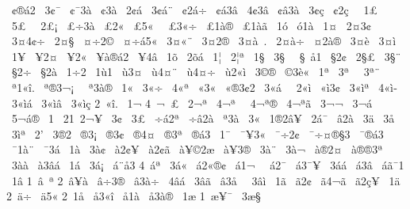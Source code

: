 {^^a0^^a2^^ae^^e12
^^a03^^a2^^af
^^a0^^a2^^af3^^e0
^^a0^^a23^^e0
^^a02^^a2^^e1
^^a03^^a2^^e1^^a8
^^a0^^a22^^e1^^f7
^^a0^^a2^^e13^^e2
^^a04^^a23^^e2
^^a0^^a2^^e23^^e0
^^a03^^a2^^e7
^^a0^^a22^^e7^^a0
^^a01^^a3
^^a05^^a3^^a0
^^a02^^a3^^a1
^^a0^^a3^^f73^^e0
^^a0^^a32^^ab
^^a0^^a35^^ab^^a0
^^a0^^a33^^ab^^f7
^^a0^^a31^^e0^^ae
^^a0^^a31^^e0^^e3
^^a01^^f3
^^a0^^f31^^e0
^^a01^^a4
^^a02^^a43^^a2
^^a03^^a44^^a2^^f7
^^a02^^a4^^a7
^^a0^^a4^^f72^^a9
^^a0^^a4^^f7^^e15^^ab
^^a03^^a4^^ab^^a8
^^a03^^a42^^ae
^^a03^^a4^^e0^^a0.
^^a02^^a4^^e0^^f7
^^a0^^a42^^e0^^ae
^^a03^^a4^^e8
^^a03^^a4^^ec
^^a01^^a5
^^a0^^a52^^a4
^^a0^^a52^^ab
^^a0^^a5^^e0^^ae^^e12
^^a0^^a54^^e2
^^a01^^f5
^^a02^^f5^^e1
^^a01^^a6
^^a02^^a6^^aa
^^a01^^a7
^^a03^^a7^^a0
^^a0^^a7^^a0^^e51
^^a0^^a72^^a2
^^a02^^a7^^a3
^^a03^^a7^^a8
^^a0^^a72^^f7
^^a0^^a72^^e0
^^a01^^f72
^^a01^^f91
^^a0^^f93^^a4
^^a0^^f94^^a4^^a8
^^a0^^f94^^a4^^f7
^^a0^^f92^^ab^^ec
^^a03^^a9^^ae
^^a0^^a93^^e8^^ab
^^a01^^aa
^^a03^^aa^^a0
^^a03^^aa^^a8
^^a0^^aa1^^ab^^ee.
^^a0^^aa^^ae3^^ac^^a1^^a0
^^a0^^aa3^^e0^^ae
^^a01^^ab
^^a03^^ab^^f7
^^a04^^ab^^aa
^^a0^^ab3^^ab
^^a0^^ab^^ae3^^a22
^^a03^^ab^^e1^^a0
^^a02^^ab^^ec
^^a0^^ab^^ec3^^a2
^^a03^^ab^^ec^^aa
^^a04^^ab^^ec^^ad
^^a03^^ab^^ec^^e1
^^a03^^ab^^ec^^e2
^^a03^^ab^^ec^^e7
2^^a0^^ab^^ee.
^^a01^^ac
4^^a0^^ac^^a0^^a3
^^a02^^ac^^aa
^^a04^^ac^^aa^^a0
^^a04^^ac^^aa^^ae
^^a04^^ac^^aa^^e3
^^a03^^ac^^ac
^^a03^^ac^^e1
^^a05^^ac^^e1^^ae
^^a01^^ad
^^a02^^ad1^^a02^^ac^^a5
^^a03^^ad^^a2
^^a03^^ad^^a3
^^a0^^ad^^f7^^e12^^aa
^^a0^^ad^^f7^^e22^^e0
^^a0^^ad^^aa3^^e0
^^a03^^ad^^ab
^^a0^^ad1^^ae2^^e2^^a5
^^a0^^ad2^^e1^^af
^^a0^^ad^^e22^^e0
^^a03^^ad^^e4
^^a03^^ad^^e5
^^a03^^ad^^ec^^aa
^^a02^^ad'
^^a03^^ae2
^^a0^^ae3^^a1
^^a0^^ae3^^a2
^^a0^^ae4^^a4
^^a0^^ae3^^aa
^^a0^^ae^^e13
^^a01^^af
^^a0^^af^^a53^^ab
^^a0^^af^^f72^^a2
^^a0^^af^^f7^^a4^^ae^^a73
^^a0^^af^^ae^^e13
^^a0^^af1^^e0^^a8
^^a0^^af3^^e1
^^a01^^e0
^^a03^^e0^^a2
^^a0^^e02^^a2^^a5
^^a0^^e02^^a2^^e3
^^a0^^e0^^a5^^a92^^e6
^^a0^^e0^^a53^^ae
^^a03^^e0^^a8
^^a03^^e0^^ac
^^a0^^e0^^ae2^^a4^^ad
^^a0^^e0^^ae^^ae3^^aa
^^a03^^e0^^e0
^^a0^^e03^^e2^^e1
^^a01^^e1
^^a03^^e1^^a1
^^a0^^e1^^a8^^ad^^e53
4^^a0^^e1^^aa
^^a03^^e1^^ab
^^a0^^e12^^ab^^ae^^a2
^^a0^^e11^^ac^^a0
^^a0^^e12^^af
^^a0^^e13^^af^^a5
^^a03^^e1^^e1
^^a0^^e13^^e2^^ad
^^a0^^e1^^e3^^af1
^^a01^^e2
1^^a0^^e2^^a0^^aa
2^^a0^^e2^^a5^^e0
^^a0^^e2^^f73^^ae
^^a0^^e23^^e0^^f7
^^a04^^e2^^e1
^^a03^^e2^^e3
^^a0^^e23^^e5^^a0
^^a03^^e2^^ec
^^a01^^e3
^^a0^^e32^^a2
^^a0^^e34^^ac^^e3
^^a0^^e32^^e7^^a5
^^a01^^e4
2^^a0^^e4^^f7
^^a0^^e45^^ab
2^^a01^^e5
^^a0^^e53^^ab^^ee
^^a0^^e51^^e0
^^a0^^e53^^e0^^ae
^^a01^^e6
1^^a0^^e6^^a5^^af
^^a03^^e6^^a7
}
